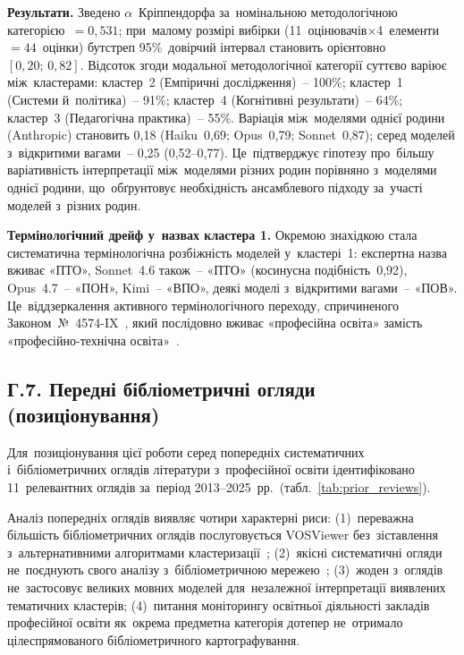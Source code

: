 \textbf{Результати.} Зведено $\alpha$~Кріппендорфа за~номінальною методологічною категорією~$=0{,}531$; при~малому розмірі вибірки (11~оцінювачів$\times$4~елементи$=44$~оцінки) бутстреп 95\%~довірчий інтервал становить орієнтовно $[0{,}20;\, 0{,}82]$. Відсоток згоди модальної методологічної категорії суттєво варіює між~кластерами: кластер~2 (Емпіричні дослідження)~-- 100\%; кластер~1 (Системи й~політика)~-- 91\%; кластер~4 (Когнітивні результати)~-- 64\%; кластер~3 (Педагогічна практика)~-- 55\%. Варіація між~моделями однієї родини (Anthropic) становить 0,18 (Haiku~0,69; Opus~0,79; Sonnet~0,87); серед моделей з~відкритими вагами~-- 0,25 (0,52--0,77). Це~підтверджує гіпотезу про~більшу варіативність інтерпретації між~моделями різних родин порівняно з~моделями однієї родини, що~обґрунтовує необхідність ансамблевого підходу за~участі моделей з~різних родин.

\textbf{Термінологічний дрейф у~назвах кластера 1.} Окремою знахідкою стала систематична термінологічна розбіжність моделей у~кластері~1: експертна назва вживає «ПТО», Sonnet~4.6 також~-- «ПТО» (косинусна подібність~0,92), Opus~4.7~-- «ПОН», Kimi~-- «ВПО», деякі моделі з~відкритими вагами~-- «ПОВ». Це~віддзеркалення активного термінологічного переходу, спричиненого Законом~№~4574-IX~\cite{Zakon4574IX}, який послідовно вживає «професійна освіта» замість «професійно-технічна освіта»~\cite{Kostrytsia2025VETRecovery}.

\subsection*{Г.7. Передні бібліометричні огляди (позиціонування)}
\label{app:bibliometric-prior}

Для~позиціонування цієї роботи серед попередніх систематичних і~бібліометричних оглядів літератури з~професійної освіти ідентифіковано 11~релевантних оглядів за~період 2013--2025~рр.\ (табл.~\ref{tab:prior_reviews}).

\begin{table}[htbp]
\centering
\caption{Попередні систематичні та~бібліометричні огляди літератури з~професійної освіти (2013--2025).}
\label{tab:prior_reviews}
\scriptsize

\end{table}

Аналіз попередніх оглядів виявляє чотири характерні риси: (1)~переважна більшість бібліометричних оглядів послуговується VOSViewer без~зіставлення з~альтернативними алгоритмами кластеризації~\cite{Calero2020Transversal, Adjei2023GreenTVET, Husaeni2023VocSchoolVOS, Omar2024TVETIndustry, Karantali2025VETBiblio}; (2)~якісні систематичні огляди не~поєднують свого аналізу з~бібліометричною мережею~\cite{Tripney2013TVETLMIC, Christidis2019NursingVET, Mende2025VETgovernance, Ciantar2025VETPolicy}; (3)~жоден з~оглядів не~застосовує великих мовних моделей для~незалежної інтерпретації виявлених тематичних кластерів; (4)~питання моніторингу освітньої діяльності закладів професійної освіти як~окрема предметна категорія дотепер не~отримало цілеспрямованого бібліометричного картографування.


